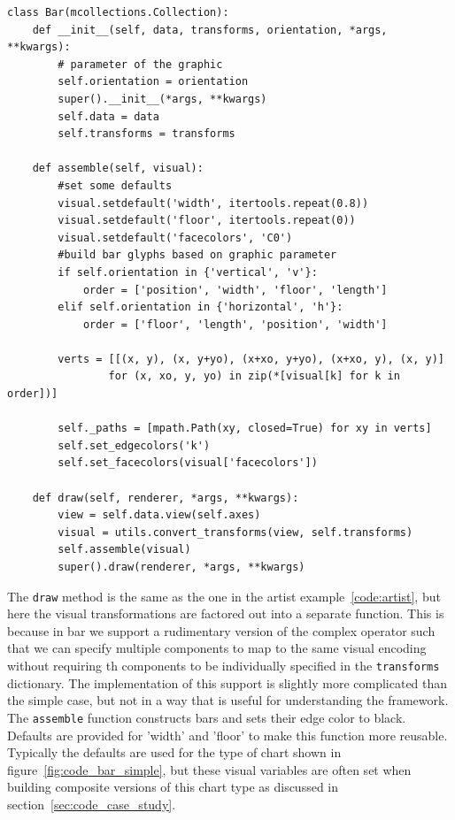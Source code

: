 \documentclass[../main.tex]{subfiles}
\begin{document}
\begin{verbatim}
class Bar(mcollections.Collection):
    def __init__(self, data, transforms, orientation, *args, **kwargs):
        # parameter of the graphic
        self.orientation = orientation 
        super().__init__(*args, **kwargs)
        self.data = data
        self.transforms = transforms
    
    def assemble(self, visual):
        #set some defaults
        visual.setdefault('width', itertools.repeat(0.8))
        visual.setdefault('floor', itertools.repeat(0))
        visual.setdefault('facecolors', 'C0')
        #build bar glyphs based on graphic parameter
        if self.orientation in {'vertical', 'v'}:
            order = ['position', 'width', 'floor', 'length']
        elif self.orientation in {'horizontal', 'h'}:
            order = ['floor', 'length', 'position', 'width']
        
        verts = [[(x, y), (x, y+yo), (x+xo, y+yo), (x+xo, y), (x, y)] 
                for (x, xo, y, yo) in zip(*[visual[k] for k in order])]

        self._paths = [mpath.Path(xy, closed=True) for xy in verts]
        self.set_edgecolors('k')
        self.set_facecolors(visual['facecolors'])
        
    def draw(self, renderer, *args, **kwargs):
        view = self.data.view(self.axes)
        visual = utils.convert_transforms(view, self.transforms)  
        self.assemble(visual)
        super().draw(renderer, *args, **kwargs)

\end{verbatim}
The \texttt{draw} method is the same as the one in the artist example~\ref{code:artist}, but here the visual transformations are factored out into a separate function. This is because in bar we support a rudimentary version of the complex \plus operator such that we can specify multiple components to map to the same visual encoding without requiring th components to be individually specified in the \texttt{transforms} dictionary. The implementation of this support is slightly more complicated than the simple case, but not in a way that is useful for understanding the framework. The \texttt{assemble} function constructs bars and sets their edge color to black. Defaults are provided for 'width' and 'floor' to make this function more reusable. Typically the defaults are used for the type of chart shown in figure~\ref{fig:code_bar_simple}, but these visual variables are often set when building composite versions of this chart type as discussed in section~\ref{sec:code_case_study}. 
\end{document}
